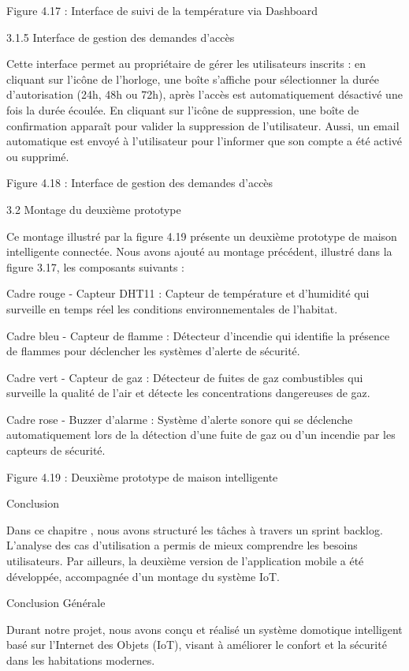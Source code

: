 \documentclass{article}
\begin{document}
Figure 4.17 : Interface de suivi de la température via Dashboard

3.1.5 Interface de gestion des demandes d’accès 

Cette interface permet au propriétaire de gérer les utilisateurs inscrits : en cliquant sur l’icône de l’horloge, une boîte s’affiche pour sélectionner la durée d’autorisation (24h, 48h ou 72h), après l’accès est automatiquement désactivé une fois la durée écoulée. En cliquant sur l’icône de suppression, une boîte de confirmation apparaît pour valider la suppression de l’utilisateur. Aussi, un email automatique est envoyé à l’utilisateur pour l’informer que son compte a été activé ou supprimé.

Figure 4.18 : Interface de gestion des demandes d’accès

3.2 Montage du deuxième prototype

Ce montage illustré par la figure 4.19  présente un deuxième prototype de maison intelligente connectée. Nous avons ajouté au montage précédent, illustré dans la figure 3.17, les composants suivants :

Cadre rouge - Capteur DHT11 : Capteur de température et d'humidité qui surveille en temps réel les conditions environnementales de l'habitat.

Cadre bleu - Capteur de flamme : Détecteur d'incendie qui identifie la présence de flammes pour déclencher les systèmes d'alerte de sécurité.

Cadre vert - Capteur de gaz : Détecteur de fuites de gaz combustibles qui surveille la qualité de l'air et détecte les concentrations dangereuses de gaz.

Cadre rose - Buzzer d'alarme : Système d'alerte sonore qui se déclenche automatiquement lors de la détection d'une fuite de gaz ou d'un incendie par les capteurs de sécurité.

Figure 4.19 : Deuxième prototype de maison intelligente

Conclusion

Dans ce chapitre , nous avons structuré les tâches à travers un sprint backlog. L’analyse des cas d’utilisation a permis de mieux comprendre les besoins utilisateurs. Par ailleurs, la deuxième version de l’application mobile a été développée, accompagnée d’un montage du système IoT. 

Conclusion Générale

Durant notre projet, nous avons conçu et réalisé un système domotique intelligent basé sur l’Internet des Objets (IoT), visant à améliorer le confort et  la sécurité dans les habitations modernes. 
\end{document}
